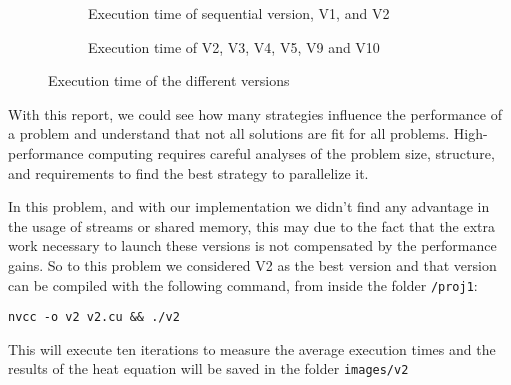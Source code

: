 \documentclass[conference]{IEEEtran}
\begin{document}
\begin{figure}[ht]
  \centering
  \begin{subfigure}[b]{0.24\textwidth}
%
    \caption{Execution time of sequential version, V1, and V2}
    \label{fig:executionTimeCompareA}
  \end{subfigure}
  \begin{subfigure}[b]{0.24\textwidth}
\caption{Execution time of V2, V3, V4, V5, V9 and V10}
    \label{fig:executionTimeCompareB}
\end{subfigure}
  \caption{Execution time of the different versions}
  \label{fig:executionTimeCompare}
\end{figure}

With this report, we could see how many strategies influence the performance of a problem and understand that not all solutions are fit for all problems. High-performance computing requires careful analyses of the problem size, structure, and requirements to find the best strategy to parallelize it.

In this problem, and with our implementation we didn't find any advantage in the usage of streams or shared memory, this may due to the fact that the extra work necessary to launch these versions is not compensated by the performance gains. So to this problem we considered V2 as the best version and that version can be compiled with the following command, from inside the folder \texttt{/proj1}:
\begin{verbatim}
nvcc -o v2 v2.cu && ./v2
\end{verbatim}
This will execute ten iterations to measure the average execution times and the results of the heat equation will be saved in the folder \texttt{images/v2}


\printbibliography
\end{document}
